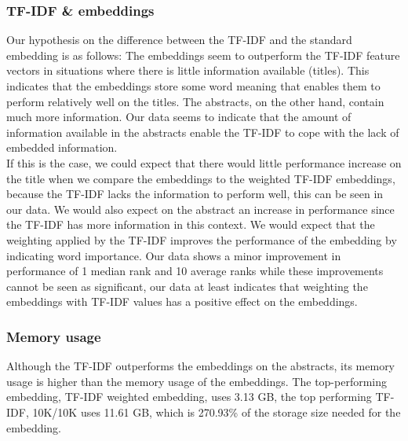 \documentclass[../../Thesis.tex]{subfiles}
\begin{document}
\subsubsection{TF-IDF \& embeddings}
Our hypothesis on the difference between the TF-IDF and the standard embedding is as follows: The embeddings seem to outperform the TF-IDF feature vectors in situations where there is little information available (titles). This indicates that the embeddings store some word meaning that enables them to perform relatively well on the titles. The abstracts, on the other hand, contain much more information. Our data seems to indicate that the amount of information available in the abstracts enable the TF-IDF to cope with the lack of embedded information. \\
If this is the case, we could expect that there would little performance increase on the title when we compare the embeddings to the weighted TF-IDF embeddings, because the TF-IDF lacks the information to perform well, this can be seen in our data. We would also expect on the abstract an increase in performance since the TF-IDF has more information in this context. We would expect that the weighting applied by the TF-IDF improves the performance of the embedding by indicating word importance. Our data shows a minor improvement in performance of 1 median rank and 10 average ranks while these improvements cannot be seen as significant, our data at least indicates that weighting the embeddings with TF-IDF values has a positive effect on the embeddings.
\subsubsection{Memory usage}
Although the TF-IDF outperforms the embeddings on the abstracts, its memory usage is higher than the memory usage of the embeddings. The top-performing embedding, TF-IDF weighted embedding, uses 3.13 GB, the top performing TF-IDF, 10K/10K uses 11.61 GB, which is 270.93\% of the storage size needed for the embedding.
\end{document}
